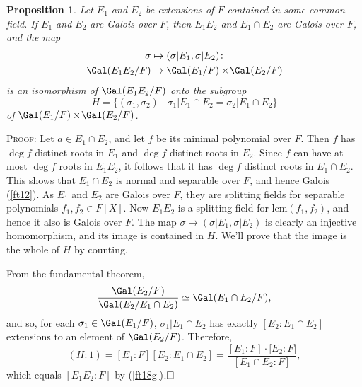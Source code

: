 \documentclass[a4paper,11pt,final,openany]{memoir}
\newtheorem{proposition}[X]{Proposition}
\theoremstyle{nonumberplain}
\begin{document}
\begin{proposition}
\label{ft18h}Let $E_{1}$ and $E_{2}$ be extensions of $F$ contained in some
common field. If $E_{1}$ and $E_{2}$ are Galois over $F$, then $E_{1}E_{2}$
and $E_{1}\cap E_{2}$ are Galois over $F$, and the map
\begin{align*}
\sigma&\mapsto(\sigma|E_{1},\sigma|E_{2})\colon\\
\Gal(E_{1}E_{2}/F)&\rightarrow
\Gal(E_{1}/F)\times\!\Gal(E_{2}/F)
\end{align*}
is an isomorphism of $\Gal(E_{1}E_{2}/F)$ onto the subgroup%
\[
H=\{(\sigma_{1},\sigma_{2})\mid\sigma_{1}|E_{1}\cap E_{2}=\sigma_{2}|E_{1}\cap
E_{2}\}
\]
of $\Gal(E_{1}/F)\times\!\Gal(E_{2}/F)$.
\end{proposition}

\noindent\textsc{Proof: }Let $a\in E_{1}\cap E_{2}$, and let $f$ be its
minimal polynomial over $F$. Then $f$ has
$\deg f$ distinct roots in $E_{1}$ and $\deg
f$ distinct roots in $E_{2}$. Since $f$ can have at most $\deg f$ roots in
$E_{1}E_{2}$, it follows that it has $\deg f$ distinct roots in $E_{1}\cap
E_{2}$. This shows that $E_{1}\cap E_{2}$ is normal and separable over $F$,
and hence Galois (\ref{ft12}).
As $E_{1}$ and $E_{2}$ are Galois over $F$, they are splitting fields for
separable polynomials $f_{1},f_{2}\in F[X]$. Now $E_{1}E_{2}$ is a splitting
field for $\textrm{lcm}(f_{1},f_{2})$, and hence it also is Galois over $F$.
The map $\sigma\mapsto(\sigma|E_{1},\sigma|E_{2})$ is clearly an injective
homomorphism, and its image is contained in $H$. We'll prove that the image is
the whole of $H$ by counting.
\begin{minipage}[t]{1.5in}
\end{minipage}


From the fundamental theorem,
\[
\frac{\Gal(E_{2}/F)}{\Gal(E_{2}/E_{1}\cap E_{2})}\simeq\Gal(E_{1}\cap
E_{2}/F)\text{,}%
\]
and so, for each $\sigma_{1}\in\Gal(E_{1}/F)$, $\sigma_{1}|E_{1}\cap E_{2}$
has exactly $[E_{2}\colon E_{1}\cap E_{2}]$ extensions to an element of
$\Gal(E_{2}/F)$. Therefore,
\[
(H\colon1)=[E_{1}\colon F][E_{2}\colon E_{1}\cap E_{2}]=\frac{[E_{1}\colon
F]\cdot\lbrack E_{2}\colon F]}{[E_{1}\cap E_{2}\colon F]},
\]
which equals $[E_{1}E_{2}\colon F]$ by (\ref{ft18g})$.\hfill\square$
\end{document}
